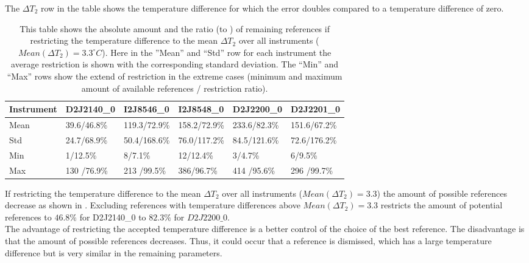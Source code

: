 The $\Delta T_{2}$ row in the table shows the temperature difference for which the error doubles compared to a temperature difference of zero.
\begin{table}
	\centering
	\begin{tabular}{|p{1.8cm}|p{2.15cm}|p{2.15cm}|p{2.15cm}|p{2.15cm}|p{2.15cm}|}
		Instrument	&D2J2140\_0&I2J8546\_0& I2J8548\_0&D2J2200\_0&D2J2201\_0\\
		\toprule
		Mean&
		39.6/46.8\%&
		119.3/72.9\%
		&158.2/72.9\%
		&233.6/82.3\%
		&151.6/67.2\%\\
		\midrule
		Std&
		24.7/68.9\%&
		50.4/168.6\%&
		76.0/117.2\%&
		84.5/121.6\%&
		72.6/176.2\%\\
		\midrule
		Min&
		1/12.5\%
		&8/7.1\%&
		12/12.4\%&
		3/4.7\% &
		6/9.5\%\\
		\midrule
		Max
		&
		130	/76.9\%&
		213	/99.5\%&
		386/96.7\%&
		414	/95.6\% &
		296	/99.7\%\\
		\bottomrule
	\end{tabular}
	\caption{This table shows the absolute amount and the ratio (to ) of remaining references if restricting the temperature difference to the mean $\Delta T_{2}$ over all instruments ($Mean(\Delta T_{2}) = 3.3^{\circ}C$). Here in the ”Mean” and “Std” row for each  instrument the average restriction is shown with the corresponding standard deviation. The “Min” and “Max” rows show the extend of restriction in the extreme cases (minimum and maximum amount of available references / restriction ratio).}
	\label{tab:decTemp}
\end{table}	
If restricting the temperature difference to the mean $\Delta T_{2}$ over all instruments ($Mean(\Delta T_{2}) = 3.3$) the amount of possible references decrease as shown in . Excluding references with temperature differences above $Mean(\Delta T_{2}) = 3.3$ restricts the amount of potential references to $46.8\%$ for D2J2140\_0 to $82.3\%$ for $D2J2200\_0$.\\
The advantage of restricting the accepted temperature difference is a better control of the choice of the best reference. The disadvantage is that the amount of possible references decreases. Thus, it could occur that a reference is dismissed, which has a large temperature difference but is very similar in the remaining parameters.\\

